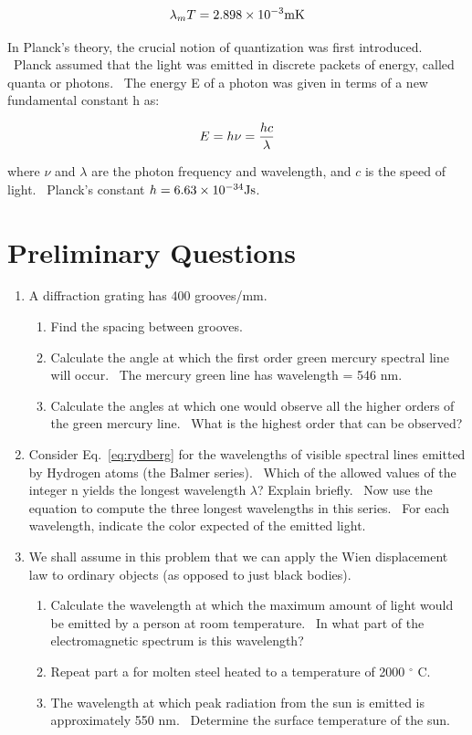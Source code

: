 \begin{equation}
\lambda_m T = 2.898 \times 10^{-3} {\rm m} {\rm K}
\label{eq:wein}
\end{equation}

In Planck's theory, the crucial notion of quantization
was first introduced. \ Planck assumed that the light was emitted in
discrete packets of energy, called quanta or photons. \ The energy E of
a photon was given in terms of a new fundamental constant h as:

\begin{equation}
 E = h\nu = {hc \over \lambda}
\label{eq:plank}
\end{equation}

where $\nu$ and $\lambda$ are the photon frequency and wavelength, and $c$
is the speed of light. \ Planck's constant $h = 6.63 \times 10^{-34} {\rm J} {\rm s}$.

\section{Preliminary Questions}
\begin{enumerate}
\item A diffraction grating has 400 grooves/mm.
\begin{enumerate}
\item Find the spacing between grooves.
\item Calculate the angle at which the first order green mercury
spectral line will occur. \ The mercury green line has wavelength = 546
nm.
\item Calculate the angles at which one would observe all the higher
orders of the green mercury line. \ What is the highest order that can be
observed?
\end{enumerate}

\item Consider Eq.~\ref{eq:rydberg} for the wavelengths of visible spectral lines
emitted by Hydrogen atoms (the Balmer series). \ Which of the allowed
values of the integer n yields the longest wavelength ${\lambda}$?
Explain briefly. \ Now use the equation to compute the three longest
wavelengths in this series. \ For each wavelength, indicate the color
expected of the emitted light.

\item We shall assume in this problem that we can apply the Wien
displacement law to ordinary objects (as opposed to just black
bodies).
\begin{enumerate}
\item Calculate the wavelength at which the maximum amount of light
would be emitted by a person at room temperature. \ In what part of the
electromagnetic spectrum is this wavelength?
\item Repeat part a for molten steel heated to a temperature of 2000
${}^\circ$ C.
\item The wavelength at which peak radiation from the sun is emitted is
approximately 550 nm. \ Determine the surface temperature of the sun.
\end{enumerate}
\end{enumerate}

